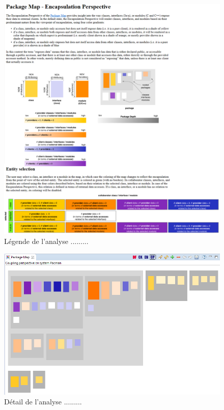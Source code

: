 \documentclass[12pt,a4paper,final]{article}
\begin{document}
\begin{figure}[ht]
	\centering
	\includegraphics[width=\textwidth]{images/InCodeEncapsulationLegende.png}
	\caption{\label{incodeEncLeg}Légende de l'analyse .........}
\end{figure}

\begin{figure}[ht]
	\centering
	\includegraphics[width=\textwidth]{images/InCodeCoupling.png}
	\caption{\label{incodeCoupl}Détail de l'analyse .........}
\end{figure}
\end{document}
